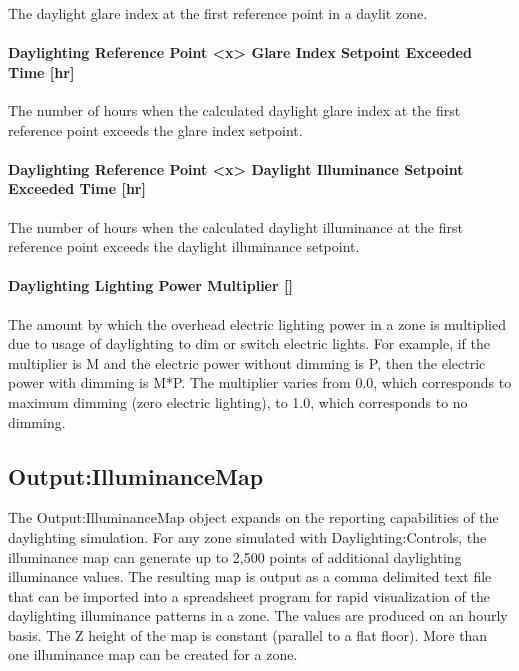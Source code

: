 The daylight glare index at the first reference point in a daylit zone.

\paragraph{Daylighting Reference Point <x> Glare Index Setpoint Exceeded Time {[}hr{]}}\label{daylighting-reference-point-1-glare-index-setpoint-exceeded-time-hr}

The number of hours when the calculated daylight glare index at the first reference point exceeds the glare index setpoint.

\paragraph{Daylighting Reference Point <x> Daylight Illuminance Setpoint Exceeded Time {[}hr{]}}\label{daylighting-reference-point-1-daylight-illuminance-setpoint-exceeded-time-hr}

The number of hours when the calculated daylight illuminance at the first reference point exceeds the daylight illuminance setpoint.

\paragraph{Daylighting Lighting Power Multiplier {[]}}\label{daylighting-lighting-power-multiplier-1}

The amount by which the overhead electric lighting power in a zone is multiplied due to usage of daylighting to dim or switch electric lights. For example, if the multiplier is M and the electric power without dimming is P, then the electric power with dimming is M*P. The multiplier varies from 0.0, which corresponds to maximum dimming (zero electric lighting), to 1.0, which corresponds to no dimming.

\subsection{Output:IlluminanceMap}\label{outputilluminancemap}

The Output:IlluminanceMap object expands on the reporting capabilities of the daylighting simulation. For any zone simulated with Daylighting:Controls, the illuminance map can generate up to 2,500 points of additional daylighting illuminance values. The resulting map is output as a comma delimited text file that can be imported into a spreadsheet program for rapid visualization of the daylighting illuminance patterns in a zone. The values are produced on an hourly basis. The Z height of the map is constant (parallel to a flat floor). More than one illuminance map can be created for a zone.

